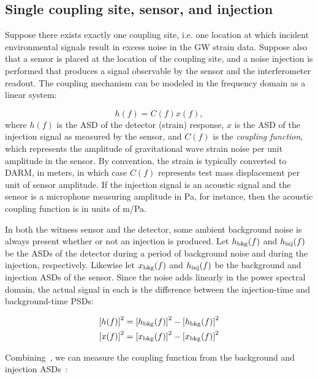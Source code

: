 \subsection{Single coupling site, sensor, and injection}

Suppose there exists exactly one coupling site, i.e. one location at which incident environmental signals result in excess noise in the \ac{GW} strain data.
Suppose also that a sensor is placed at the location of the coupling site, and a noise injection is performed that produces a signal observable by the sensor and the interferometer readout.
The coupling mechanism can be modeled in the frequency domain as a linear system:

\begin{equation}\label{eq:cf_model}
	h(f) = C(f) x(f),
\end{equation}
where $h(f)$ is the \ac{ASD} of the detector (strain) response, $x$ is the \ac{ASD} of the injection signal as measured by the sensor, and $C(f)$ is the \textit{coupling function}, which represents the amplitude of gravitational wave strain noise per unit amplitude in the sensor.
By convention, the strain is typically converted to \ac{DARM}, in meters, in which case $C(f)$ represents  test mass displacement per unit of sensor amplitude.
If the injection signal is an acoustic signal and the sensor is a microphone measuring amplitude in Pa, for instance, then the acoustic coupling function is in units of m/Pa.

In both the witness sensor and the detector, some ambient background noise is always present whether or not an injection is produced. Let $h_{\textrm{bkg}}(f)$ and $h_{\textrm{inj}}(f)$ be the \acp{ASD} of the detector during a period of background noise and during the injection, respectively. Likewise let $x_{\textrm{bkg}}(f)$ and $h_{\textrm{inj}}(f)$ be the background and injection \acp{ASD} of the sensor. Since the noise adds linearly in the power spectral domain, the actual signal in each is the difference between the injection-time and background-time \acp{PSD}:

\begin{align}
	\left[h(f)\right]^2 &= \left[h_{\textrm{bkg}}(f)\right]^2 - \left[h_{\textrm{bkg}}(f)\right]^2 \label{eq:h_inj}\\
	\left[x(f)\right]^2 &= \left[x_{\textrm{bkg}}(f)\right]^2 - \left[x_{\textrm{bkg}}(f)\right]^2 \label{eq:x_inj}
\end{align}

Combining~, we can measure the coupling function from the background and injection \acp{ASD}~\citep{Kruk_2016, pem_code}:

